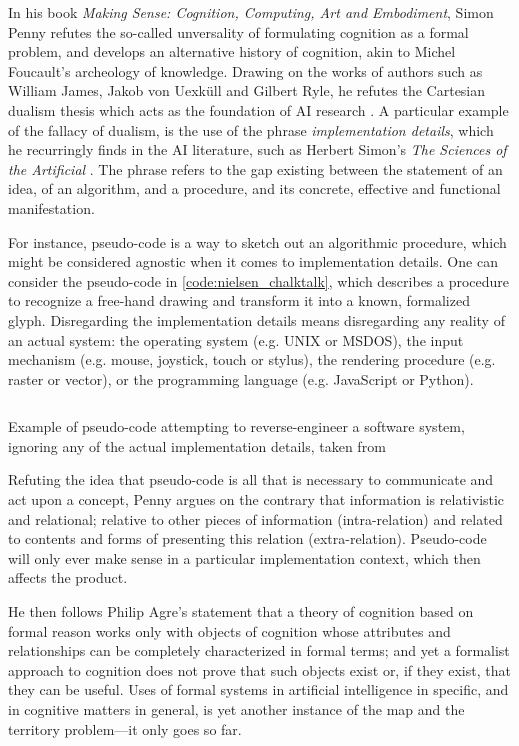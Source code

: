 In his book \emph{Making Sense: Cognition, Computing, Art and Embodiment}, Simon Penny refutes the so-called unversality of formulating cognition as a formal problem, and develops an alternative history of cognition, akin to Michel Foucault's archeology of knowledge. Drawing on the works of authors such as William James, Jakob von Uexküll and Gilbert Ryle, he refutes the Cartesian dualism thesis which acts as the foundation of AI research \citep{penny_making_2019}. A particular example of the fallacy of dualism, is the use of the phrase \emph{implementation details}, which he recurringly finds in the AI literature, such as Herbert Simon's \emph{The Sciences of the Artificial} \citep{simon_sciences_1996}. The phrase refers to the gap existing between the statement of an idea, of an algorithm, and a procedure, and its concrete, effective and functional manifestation.

For instance, pseudo-code is a way to sketch out an algorithmic procedure, which might be considered agnostic when it comes to implementation details. One can consider the pseudo-code in \ref{code:nielsen_chalktalk}, which describes a procedure to recognize a free-hand drawing and transform it into a known, formalized glyph. Disregarding the implementation details means disregarding any reality of an actual system: the operating system (e.g. UNIX or MSDOS), the input mechanism (e.g. mouse, joystick, touch or stylus), the rendering procedure (e.g. raster or vector), or the programming language (e.g. JavaScript or Python).

\begin{listing}
\inputminted{text}{./corpus/pseudocode.txt}
    \caption{Example of pseudo-code attempting to reverse-engineer a software system, ignoring any of the actual implementation details, taken from \citep{nielsen_working_2017}}
    \label{code:nielsen_chalktalk}
\end{listing}

Refuting the idea that pseudo-code is all that is necessary to communicate and act upon a concept, Penny  argues on the contrary that information is relativistic and relational; relative to other pieces of information (intra-relation) and related to contents and forms of presenting this relation (extra-relation). Pseudo-code will only ever make sense in a particular implementation context, which then affects the product.

He then follows Philip Agre's statement that a theory of cognition based on formal reason works only with objects of cognition whose attributes and relationships can be completely characterized in formal terms; and yet a formalist approach to cognition does not prove that such objects exist or, if they exist, that they can be useful. Uses of formal systems in artificial intelligence in specific, and in cognitive matters in general, is yet another instance of the map and the territory problem—it only goes so far.

